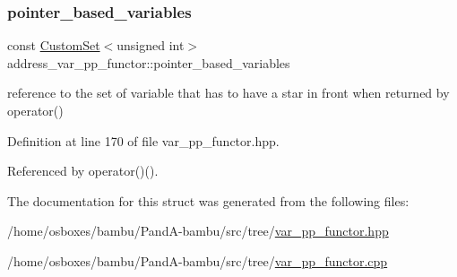 \subsubsection{\texorpdfstring{pointer\+\_\+based\+\_\+variables}{pointer\_based\_variables}}
{\footnotesize\ttfamily const \hyperlink{custom__set_8hpp_a615bc2f42fc38a4bb1790d12c759e86f}{Custom\+Set}$<$unsigned int$>$ address\+\_\+var\+\_\+pp\+\_\+functor\+::pointer\+\_\+based\+\_\+variables\hspace{0.3cm}{\ttfamily [private]}}



reference to the set of variable that has to have a star in front when returned by operator() 



Definition at line 170 of file var\+\_\+pp\+\_\+functor.\+hpp.



Referenced by operator()().



The documentation for this struct was generated from the following files\+:\begin{DoxyCompactItemize}
\item 
/home/osboxes/bambu/\+Pand\+A-\/bambu/src/tree/\hyperlink{var__pp__functor_8hpp}{var\+\_\+pp\+\_\+functor.\+hpp}\item 
/home/osboxes/bambu/\+Pand\+A-\/bambu/src/tree/\hyperlink{var__pp__functor_8cpp}{var\+\_\+pp\+\_\+functor.\+cpp}\end{DoxyCompactItemize}
